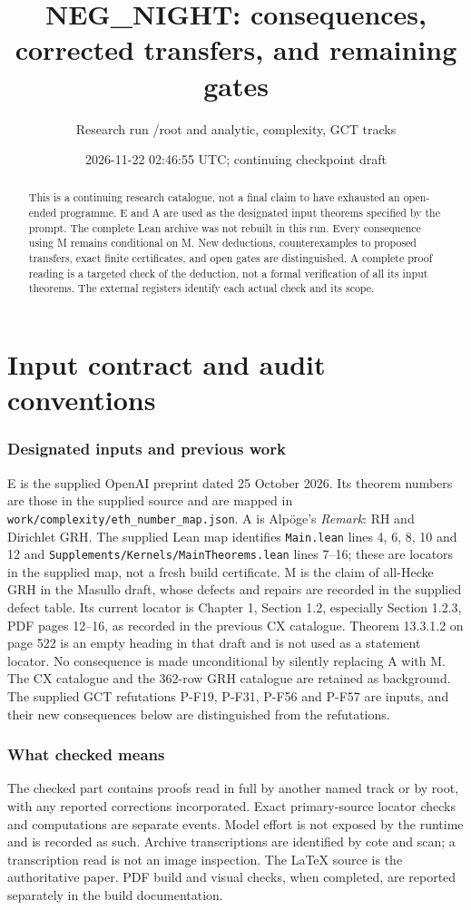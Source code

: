 \documentclass[11pt]{article}
\title{NEG\_NIGHT: consequences, corrected transfers, and remaining gates}
\author{Research run /root and analytic, complexity, GCT tracks}
\date{2026-11-22 02:46:55 UTC; continuing checkpoint draft}
\theoremstyle{definition}
\begin{document}
\maketitle
\begin{abstract}
This is a continuing research catalogue, not a final claim to have exhausted
an open-ended programme. E and A are used as the designated input theorems
specified by the prompt. The complete Lean archive was not rebuilt in this
run. Every consequence using M remains conditional on M. New deductions,
counterexamples to proposed transfers, exact finite certificates, and open
gates are distinguished. A complete proof reading is a targeted check of the
deduction, not a formal verification of all its input theorems. The external
registers identify each actual check and its scope.
\end{abstract}
\tableofcontents
\part{Input contract and audit conventions}
\section{Designated inputs and previous work}
E is the supplied OpenAI preprint dated 25 October 2026. Its theorem numbers
are those in the supplied source and are mapped in
\texttt{work/complexity/eth\_number\_map.json}. A is Alp\"oge's
\emph{Remark}: RH and Dirichlet GRH. The supplied Lean map identifies
\texttt{Main.lean} lines 4, 6, 8, 10 and 12 and
\texttt{Supplements/Kernels/MainTheorems.lean} lines 7--16;
these are locators in the supplied map, not a fresh build certificate.
M is the claim of all-Hecke GRH in the Masullo draft, whose defects and
repairs are recorded in the supplied defect table. Its current locator is
Chapter 1, Section 1.2, especially Section 1.2.3, PDF pages 12--16,
as recorded in the previous CX catalogue. Theorem 13.3.1.2 on page 522
is an empty heading in that draft and is not used as a statement locator.
No consequence is made
unconditional by silently replacing A with M.
The CX catalogue and the 362-row GRH catalogue are retained as background.
The supplied GCT refutations P-F19, P-F31, P-F56 and P-F57 are inputs,
and their new consequences below are distinguished from the refutations.
\section{What checked means}
The checked part contains proofs read in full by another named track or by
root, with any reported corrections incorporated. Exact primary-source
locator checks and computations are separate events. Model effort is not
exposed by the runtime and is recorded as such. Archive transcriptions are
identified by cote and scan; a transcription read is not an image inspection.
The LaTeX source is the authoritative paper. PDF build and visual checks,
when completed, are reported separately in the build documentation.
\end{document}
